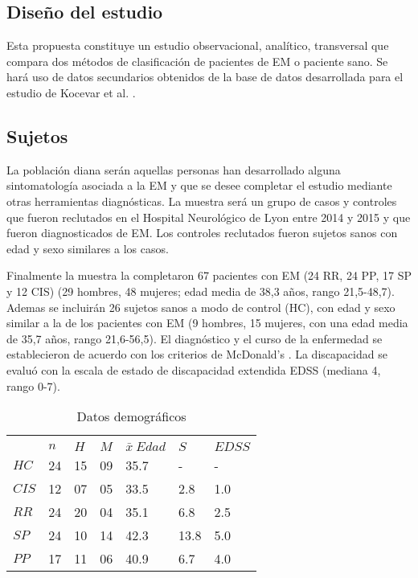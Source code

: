 \documentclass[fleqn,12pt]{UICArticle} %
\begin{document}
\subsection{Diseño del estudio}

Esta propuesta constituye un estudio observacional, analítico, transversal que compara dos métodos de clasificación de pacientes de EM o paciente sano. Se hará uso de datos secundarios obtenidos de la base de datos desarrollada para el estudio de Kocevar et al. \cite{Kocevar2016}.

\subsection{Sujetos}
La población diana serán aquellas personas han desarrollado alguna sintomatología asociada a la EM y que se desee completar el estudio mediante otras herramientas diagnósticas. La muestra será un grupo de casos y controles que fueron reclutados en el Hospital Neurológico de Lyon entre 2014 y 2015 y que fueron diagnosticados de EM. Los controles reclutados fueron sujetos sanos con edad y sexo similares a los casos.

Finalmente la muestra la completaron 67 pacientes con EM (24 RR, 24 PP, 17 SP y 12 CIS) (29 hombres, 48 mujeres; edad media de 38,3 años, rango 21,5-48,7). Ademas se incluirán 26 sujetos sanos a modo de control (HC), con edad y sexo similar a la de los pacientes con EM (9 hombres, 15 mujeres, con una edad media de 35,7 años, rango 21,6-56,5). El diagnóstico y el curso de la enfermedad se establecieron de acuerdo con los criterios de McDonald's \cite{Polman2011}. La discapacidad se evaluó con la escala de estado de discapacidad extendida EDSS (mediana 4, rango 0-7).

\begin{table}[hbt]
\caption{Datos demográficos}
\centering
\begin{tabular}{lllllll}
\toprule
\multicolumn{7}{l}{} \\
     & $n$   & $H$ & $M$  & $\bar{x} ~Edad$  & $S$  & $EDSS$  \\
$HC$   & 24  & 15  & 09   & 35.7  & -     & -     \\
$CIS$  & 12  & 07  & 05   & 33.5  & 2.8   & 1.0   \\
$RR$   & 24  & 20  & 04   & 35.1  & 6.8   & 2.5   \\
$SP$   & 24  & 10  & 14   & 42.3  & 13.8  & 5.0   \\
$PP$   & 17  & 11  & 06   & 40.9  & 6.7   & 4.0   \\
\bottomrule
\end{tabular}
\label{tab:demographics}
\end{table}
\end{document}

